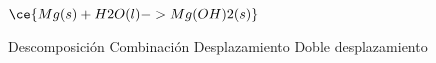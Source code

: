 $\ce{Mg(s) + H2O(l) -> Mg(OH)2(s)}$

\begin{choices}
    \choice Descomposición
    \CorrectChoice Combinación
    \choice Desplazamiento
    \choice Doble desplazamiento
\end{choices}
